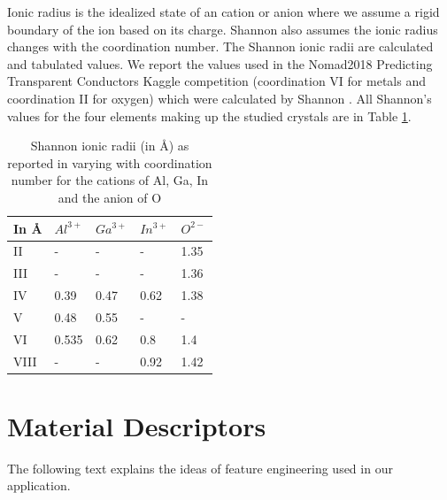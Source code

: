 \documentclass[11pt,oneside,czech,american]{book} %
\theoremstyle{definition} %
\theoremstyle{definition}
\begin{document}
Ionic radius is the idealized state of an cation or anion where we assume a rigid boundary of the ion based on its charge. Shannon also assumes the ionic radius changes with the coordination number. The Shannon ionic radii are calculated and tabulated values. We report the values used in the Nomad2018 Predicting Transparent Conductors Kaggle competition (coordination VI for metals and coordination II for oxygen) which were calculated by Shannon \parencite{shannon76}.  All Shannon's values for the four elements making up the studied crystals are in Table \ref{shannon_radii}.

\begin{table}[H]
	\centering
	\begin{tabular}{lllll} 
		\hline
		In \AA & $Al^{3+}$    & $Ga^{3+}$    & $In^{3+}$    & $O^{2-}$    \\ 
		\hline
		II     & - & - & - & 1.35  \\
		
		III     & - & - & - & 1.36  \\ 
		
		IV     & 0.39 & 0.47 & 0.62 & 1.38  \\ 
		
		V   & 0.48 & 0.55 & - & -  \\ 
		
		VI   & 0.535 & 0.62 & 0.8 & 1.4  \\ 
		
		VIII   & - & - & 0.92 & 1.42  \\
		\hline
	\end{tabular}
	
	\caption{Shannon ionic radii (in \AA) as reported in \parencite{shannon76} varying with coordination number for the cations of Al, Ga, In and the anion of O}
	\label{shannon_radii}
\end{table}



\section{Material Descriptors}
The following text explains the ideas of feature engineering used in our application.
\end{document}

